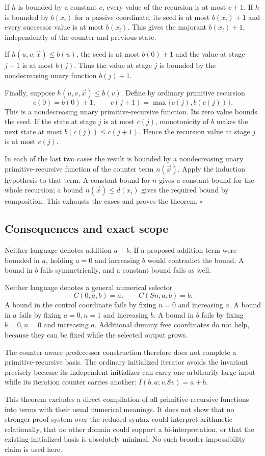 If $h$ is bounded by a constant $c$, every value of the recursion is
at most $c+1$.  If $h$ is bounded by $b(x_i)$ for a passive coordinate,
its seed is at most $b(x_i)+1$ and every successor value is at most
$b(x_i)$.  This gives the majorant $b(x_i)+1$, independently of the
counter and previous state.

If $h(u,v,\vec x)\leq b(u)$, the seed is at most $b(0)+1$ and
the value at stage $j+1$ is at most $b(j)$.  Thus the value at stage
$j$ is bounded by the nondecreasing unary function $b(j)+1$.

Finally, suppose $h(u,v,\vec x)\leq b(v)$.  Define by ordinary
primitive recursion
\[
 c(0)=b(0)+1,\qquad
 c(j+1)=\max\{c(j),b(c(j))\}.
\]
This is a nondecreasing unary primitive-recursive function.  Its zero
value bounds the seed.  If the state at stage $j$ is at most $c(j)$,
monotonicity of $b$ makes the next state at most $b(c(j))\leq c(j+1)$.
Hence the recursion value at stage $j$ is at most $c(j)$.

In each of the last two cases the result is bounded by a nondecreasing
unary primitive-recursive function of the counter term $n(\vec x)$.
Apply the induction hypothesis to that term.  A constant bound for $n$
gives a constant bound for the whole recursion; a bound
$n(\vec x)\leq d(x_i)$ gives the required bound by composition.
This exhausts the cases and proves the theorem.
\hfill$\square$

\subsection{Consequences and exact scope}

Neither language denotes addition $a+b$.  If a proposed addition term
were bounded in $a$, holding $a=0$ and increasing $b$ would contradict
the bound.  A bound in $b$ fails symmetrically, and a constant bound
fails as well.

Neither language denotes a general numerical selector
\[
 C(0,a,b)=a,\qquad C(Sn,a,b)=b.
\]
A bound in the control coordinate fails by fixing $n=0$ and increasing
$a$.  A bound in $a$ fails by fixing $a=0,n=1$ and increasing $b$.
A bound in $b$ fails by fixing $b=0,n=0$ and increasing $a$.
Additional dummy free coordinates do not help, because they can be
fixed while the selected output grows.

The counter-aware predecessor construction therefore does not complete
a primitive-recursive basis.  The ordinary initialized iterator avoids
the invariant precisely because its independent initializer can carry
one arbitrarily large input while its iteration counter carries another:
$I(b,a;v.Sv)=a+b$.

This theorem excludes a direct compilation of all primitive-recursive
functions into terms with their usual numerical meanings.  It does not
show that no stronger proof system over the reduced syntax could
interpret arithmetic relationally, that no other domain could support a
bi-interpretation, or that the existing initialized basis is absolutely
minimal.  No such broader impossibility claim is used here.
